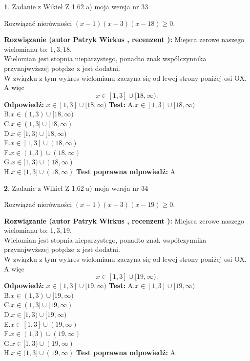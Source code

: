 \documentclass[12pt, a4paper]{article}
\theoremstyle{definition} %
\newtheorem{zad}{}
\newcommand{\zadStart}[1]{\begin{zad}#1\newline}
\newcommand{\zadStop}{\end{zad}}
\newcommand{\rozwStart}[2]{\noindent \textbf{Rozwiązanie (autor #1 , recenzent #2): }\newline}
\newcommand{\rozwStop}{\newline}
\newcommand{\odpStart}{\noindent \textbf{Odpowiedź:}\newline}
\newcommand{\odpStop}{\newline}
\newcommand{\testStart}{\noindent \textbf{Test:}\newline}
\newcommand{\testStop}{\newline}
\newcommand{\kluczStart}{\noindent \textbf{Test poprawna odpowiedź:}\newline}
\newcommand{\kluczStop}{\newline}
\begin{document}
\zadStart{Zadanie z Wikieł Z 1.62 a) moja wersja nr 33}

Rozwiązać nierówności $(x-1)(x-3)(x-18)\ge0$.
\zadStop
\rozwStart{Patryk Wirkus}{}
Miejsca zerowe naszego wielomianu to: $1, 3, 18$.\\
Wielomian jest stopnia nieparzystego, ponadto znak współczynnika przy\linebreak najwyższej potędze x jest dodatni.\\ W związku z tym wykres wielomianu zaczyna się od lewej strony poniżej osi OX. A więc $$x \in [1,3] \cup [18,\infty).$$
\rozwStop
\odpStart
$x \in [1,3] \cup [18,\infty)$
\odpStop
\testStart
A.$x \in [1,3] \cup [18,\infty)$\\
B.$x \in (1,3) \cup [18,\infty)$\\
C.$x \in (1,3] \cup [18,\infty)$\\
D.$x \in [1,3) \cup [18,\infty)$\\
E.$x \in [1,3] \cup (18,\infty)$\\
F.$x \in (1,3) \cup (18,\infty)$\\
G.$x \in [1,3) \cup (18,\infty)$\\
H.$x \in (1,3] \cup (18,\infty)$
\testStop
\kluczStart
A
\kluczStop



\zadStart{Zadanie z Wikieł Z 1.62 a) moja wersja nr 34}

Rozwiązać nierówności $(x-1)(x-3)(x-19)\ge0$.
\zadStop
\rozwStart{Patryk Wirkus}{}
Miejsca zerowe naszego wielomianu to: $1, 3, 19$.\\
Wielomian jest stopnia nieparzystego, ponadto znak współczynnika przy\linebreak najwyższej potędze x jest dodatni.\\ W związku z tym wykres wielomianu zaczyna się od lewej strony poniżej osi OX. A więc $$x \in [1,3] \cup [19,\infty).$$
\rozwStop
\odpStart
$x \in [1,3] \cup [19,\infty)$
\odpStop
\testStart
A.$x \in [1,3] \cup [19,\infty)$\\
B.$x \in (1,3) \cup [19,\infty)$\\
C.$x \in (1,3] \cup [19,\infty)$\\
D.$x \in [1,3) \cup [19,\infty)$\\
E.$x \in [1,3] \cup (19,\infty)$\\
F.$x \in (1,3) \cup (19,\infty)$\\
G.$x \in [1,3) \cup (19,\infty)$\\
H.$x \in (1,3] \cup (19,\infty)$
\testStop
\kluczStart
A
\kluczStop
\end{document}
